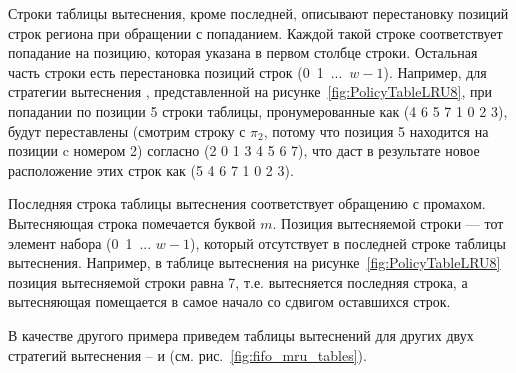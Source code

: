 Строки таблицы вытеснения, кроме последней, описывают перестановку позиций строк
региона при обращении с попаданием. Каждой такой строке соответствует попадание
на позицию, которая указана в первом столбце строки. Остальная часть строки есть
перестановка позиций строк (0~1~...~$w{-}1$). Например, для стратегии вытеснения
\LRU,
представленной на рисунке~\ref{fig:PolicyTableLRU8}, при попадании по позиции 5
строки таблицы, пронумерованные как (4 6 5 7 1 0 2 3), будут переставлены
(смотрим строку с $\pi_2$, потому что позиция 5 находится на позиции c номером
2) согласно (2 0 1 3 4 5 6 7), что даст в результате новое расположение этих
строк как (5 4 6 7 1 0 2 3).

Последняя строка таблицы вытеснения соответствует обращению с промахом.
Вытесняющая строка помечается буквой $m$. Позиция вытесняемой строки --- тот
элемент набора (0~1~... $w{-}1$), который отсутствует в последней строке таблицы
вытеснения. Например, в таблице вытеснения на рисунке~\ref{fig:PolicyTableLRU8}
позиция вытесняемой строки равна 7, т.е. вытесняется последняя строка, а
вытесняющая помещается в самое начало со сдвигом оставшихся строк.

В качестве другого примера приведем таблицы вытеснений для других двух стратегий
вытеснения -- \FIFO и \MRU (см. рис.~\ref{fig:fifo_mru_tables}).


